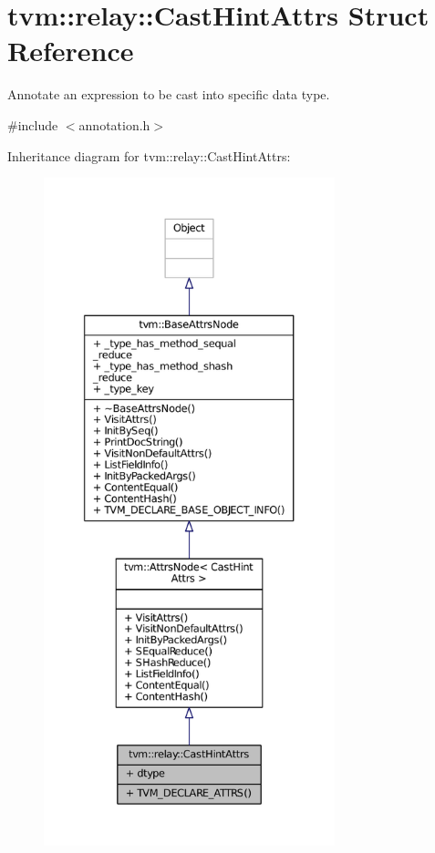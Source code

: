 \hypertarget{structtvm_1_1relay_1_1CastHintAttrs}{}\section{tvm\+:\+:relay\+:\+:Cast\+Hint\+Attrs Struct Reference}
\label{structtvm_1_1relay_1_1CastHintAttrs}


Annotate an expression to be cast into specific data type.  




{\ttfamily \#include $<$annotation.\+h$>$}



Inheritance diagram for tvm\+:\+:relay\+:\+:Cast\+Hint\+Attrs\+:
\nopagebreak
\begin{figure}[H]
\begin{center}
\leavevmode
\includegraphics[height=550pt]{structtvm_1_1relay_1_1CastHintAttrs__inherit__graph}
\end{center}
\end{figure}


